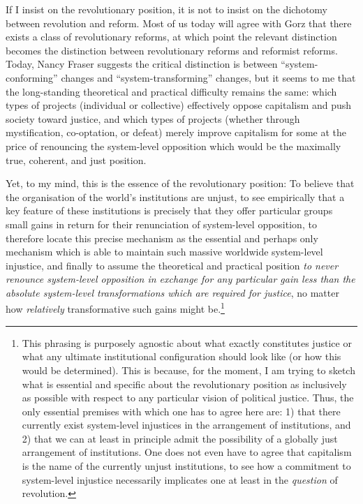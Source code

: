 \documentclass[a4paper,12pt,margin=.5in]{article}
\begin{document}
If I insist on the revolutionary position, it is not to insist on the
dichotomy between revolution and reform. Most of us today will agree
with Gorz that there exists a class of revolutionary reforms, at which
point the relevant distinction becomes the distinction between
revolutionary reforms and reformist reforms. Today, Nancy Fraser
suggests the critical distinction is between ``system-conforming''
changes and ``system-transforming'' changes, but it seems to me that the
long-standing theoretical and practical difficulty remains the same:
which types of projects (individual or collective) effectively oppose
capitalism and push society toward justice, and which types of projects
(whether through mystification, co-optation, or defeat) merely improve
capitalism for some at the price of renouncing the system-level
opposition which would be the maximally true, coherent, and just
position.

Yet, to my mind, this is the essence of the revolutionary position: To
believe that the organisation of the world's institutions are unjust, to
see empirically that a key feature of these institutions is precisely
that they offer particular groups small gains in return for their
renunciation of system-level opposition, to therefore locate this
precise mechanism as the essential and perhaps only mechanism which is
able to maintain such massive worldwide system-level injustice, and
finally to assume the theoretical and practical position \emph{to never
renounce system-level opposition in exchange for any particular gain
less than the absolute system-level transformations which are required
for justice}, no matter how \emph{relatively} transformative such gains
might be.\footnote{This phrasing is purposely agnostic about what
  exactly constitutes justice or what any ultimate institutional
  configuration should look like (or how this would be determined). This
  is because, for the moment, I am trying to sketch what is essential
  and specific about the revolutionary position as inclusively as
  possible with respect to any particular vision of political justice.
  Thus, the only essential premises with which one has to agree here
  are: 1) that there currently exist system-level injustices in the
  arrangement of institutions, and 2) that we can at least in principle
  admit the possibility of a globally just arrangement of institutions.
  One does not even have to agree that capitalism is the name of the
  currently unjust institutions, to see how a commitment to system-level
  injustice necessarily implicates one at least in the \emph{question}
  of revolution.}
\end{document}
